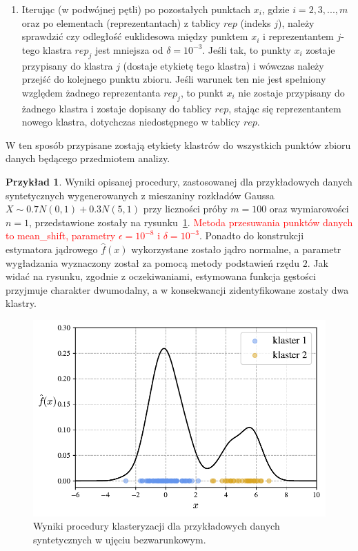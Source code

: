 \documentclass[12pt,a4paper,oneside]{book}
\theoremstyle{definition}
\newtheorem{exmp}{Przykład}[chapter]
\begin{document}
\begin{enumerate}
\begin{enumerate}
\item Iterując (w podwójnej pętli) po pozostałych punktach $x_i$, gdzie $i=2,3,...,m$ oraz po elementach (reprezentantach) z tablicy $rep$ (indeks $j$), należy sprawdzić czy odległość euklidesowa między punktem $x_i$ i reprezentantem $j$-tego klastra $rep_j$ jest mniejsza od $\delta=10^{-3}$. Jeśli tak, to punkty $x_i$ zostaje przypisany do klastra $j$ (dostaje etykietę tego klastra) i wówczas należy przejść do kolejnego punktu zbioru. Jeśli warunek ten nie jest spełniony względem żadnego reprezentanta $rep_j$, to punkt $x_i$ nie zostaje przypisany do żadnego klastra i zostaje dopisany do tablicy $rep$, stając się reprezentantem nowego klastra, dotychczas niedostępnego w tablicy $rep$.
\end{enumerate}
W ten sposób przypisane zostają etykiety klastrów do wszystkich punktów zbioru danych będącego przedmiotem analizy.
\end{enumerate}
\begin{exmp} \label{exmp:clustering_example}
Wyniki opisanej procedury, zastosowanej dla przykładowych danych syntetycznych wygenerowanych z mieszaniny rozkładów Gaussa $X \sim 0.7 N(0,1) + 0.3 N(5,1)$ przy liczności próby $m=100$ oraz wymiarowości $n=1$, przedstawione zostały na rysunku~\ref{fig:clustering_example}. \textcolor{red}{Metoda przesuwania punktów danych to mean\_shift, parametry $\epsilon = 10^{-8}$ i $\delta = 10^{-3}$}. Ponadto do konstrukcji estymatora jądrowego $\hat{f}(x)$ wykorzystane zostało jądro normalne, a parametr wygładzania wyznaczony został za pomocą metody podstawień rzędu $2$. Jak widać na rysunku, zgodnie z oczekiwaniami, estymowana funkcja gęstości przyjmuje charakter dwumodalny, a w konsekwancji zidentyfikowane zostały dwa klastry.
\begin{figure}[H]
    \centering
    \includegraphics[scale=0.65]{clustering_example}
    \vspace{-0.5cm} 
    \caption{Wyniki procedury klasteryzacji dla przykładowych danych syntetycznych w ujęciu bezwarunkowym.}
    \label{fig:clustering_example}
\end{figure}
\end{exmp}
\end{document}

